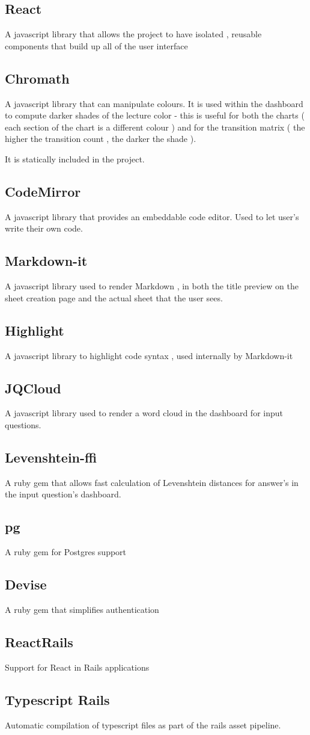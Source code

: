\subsection{React}
A javascript library that allows the project to have isolated , reusable components that build up all of the user interface

\subsection{Chromath} 
A javascript library that can manipulate colours. It is used within the dashboard to compute darker shades of the lecture color - this is useful for both the charts ( each section of the chart is a different colour ) and for the transition matrix ( the higher the transition count , the darker the shade ).

	It is statically included in the project.
	
\subsection{CodeMirror}
A javascript library that provides an embeddable code editor. Used to let user's write their own code.

\subsection{Markdown-it}
A javascript library used to render Markdown , in both the title preview on the sheet creation page and the actual sheet that the user sees.

\subsection{Highlight}
A javascript library to highlight code syntax , used internally by Markdown-it
	
\subsection{JQCloud}
A javascript library used to render a word cloud in the dashboard for input questions.

\subsection{Levenshtein-ffi}
A ruby gem that allows fast calculation of Levenshtein distances for answer's in the input question's dashboard.

\subsection{pg}
A ruby gem for Postgres support

\subsection{Devise}
A ruby gem that simplifies authentication

\subsection{ReactRails}
Support for React in Rails applications

\subsection{Typescript Rails}
Automatic compilation of typescript files as part of the rails asset pipeline.

